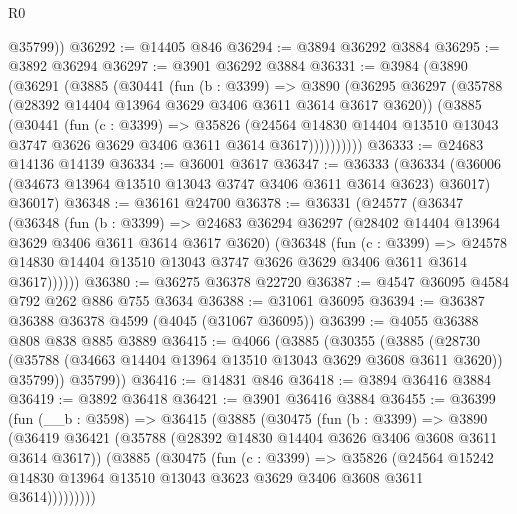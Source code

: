 \begin{lexlean}{R0}
\begin{coremodule}
        @35799))
@36292 := @14405 @846
@36294 := @3894 @36292 @3884
@36295 := @3892 @36294
@36297 := @3901 @36292 @3884
@36331 := @3984
    (@3890
      (@36291
        (@3885
          (@30441
            (fun (b : @3399) =>
            @3890
              (@36295
                @36297
                (@35788 (@28392 @14404 @13964 @3629 @3406 @3611 @3614 @3617 @3620))
                (@3885
                  (@30441
                    (fun (c : @3399) =>
                    @35826
                      (@24564
                        @14830
                        @14404
                        @13510
                        @13043
                        @3747
                        @3626
                        @3629
                        @3406
                        @3611
                        @3614
                        @3617))))))))))
@36333 := @24683 @14136 @14139
@36334 := @36001 @3617
@36347 := @36333
    (@36334 (@36006 (@34673 @13964 @13510 @13043 @3747 @3406 @3611 @3614 @3623) @36017) @36017)
@36348 := @36161 @24700
@36378 := @36331
    (@24577
      (@36347
        (@36348
          (fun (b : @3399) =>
          @24683
            @36294
            @36297
            (@28402 @14404 @13964 @3629 @3406 @3611 @3614 @3617 @3620)
            (@36348
              (fun (c : @3399) =>
              @24578 @14830 @14404 @13510 @13043 @3747 @3626 @3629 @3406 @3611 @3614 @3617))))))
@36380 := @36275 @36378 @22720
@36387 := @4547 @36095 @4584 @792 @262 @886 @755 @3634
@36388 := @31061 @36095
@36394 := @36387 @36388 @36378 @4599 (@4045 (@31067 @36095))
@36399 := @4055 @36388 @808 @838 @885 @3889
@36415 := @4066
    (@3885
      (@30355
        (@3885
          (@28730 (@35788 (@34663 @14404 @13964 @13510 @13043 @3629 @3608 @3611 @3620)) @35799))
        @35799))
@36416 := @14831 @846
@36418 := @3894 @36416 @3884
@36419 := @3892 @36418
@36421 := @3901 @36416 @3884
@36455 := @36399
    (fun (__b : @3598) =>
    @36415
      (@3885
        (@30475
          (fun (b : @3399) =>
          @3890
            (@36419
              @36421
              (@35788 (@28392 @14830 @14404 @3626 @3406 @3608 @3611 @3614 @3617))
              (@3885
                (@30475
                  (fun (c : @3399) =>
                  @35826
                    (@24564
                      @15242
                      @14830
                      @13964
                      @13510
                      @13043
                      @3623
                      @3629
                      @3406
                      @3608
                      @3611
                      @3614)))))))))

\end{coremodule}
\end{lexlean}
